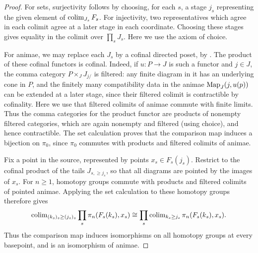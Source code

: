 
	\begin{proof}
		For sets, surjectivity follows by choosing, for each $s$, a stage $j_s$ representing the given element of $\operatorname{colim}_{J_s}F_s$. For injectivity, two representatives which agree in each colimit agree at a later stage in each coordinate. Choosing these stages gives equality in the colimit over $\prod_s J_s$. Here we use the axiom of choice.

		For animae, we may replace each $J_s$ by a cofinal directed poset, by . The product of these cofinal functors is cofinal. Indeed, if $u\colon P\to J$ is such a functor and $j\in J$, the comma category $P\times_J J_{j/}$ is filtered: any finite diagram in it has an underlying cone in $P$, and the finitely many compatibility data in the animae $\operatorname{Map}_J(j,u(p))$ can be extended at a later stage, since their filtered colimit is contractible by cofinality. Here we use that filtered colimits of animae commute with finite limits. Thus the comma categories for the product functor are products of nonempty filtered categories, which are again nonempty and filtered (using choice), and hence contractible. The set calculation proves that the comparison map induces a bijection on $\pi_0$, since $\pi_0$ commutes with products and filtered colimits of animae.

		Fix a point in the source, represented by points $x_s \in F_s(j_s)$. Restrict to the cofinal product of the tails $J_{s,\geq j_s}$, so that all diagrams are pointed by the images of $x_s$. For $n \geq 1$, homotopy groups commute with products and filtered colimits of pointed animae. Applying the set calculation to these homotopy groups therefore gives
		\[
			\operatorname{colim}_{(k_s)_s \geq (j_s)_s}\prod_s \pi_n(F_s(k_s),x_s)
			\cong \prod_s \operatorname{colim}_{k_s \geq j_s}\pi_n(F_s(k_s),x_s).
		\]
		Thus the comparison map induces isomorphisms on all homotopy groups at every basepoint, and is an isomorphism of animae.
	\end{proof}

